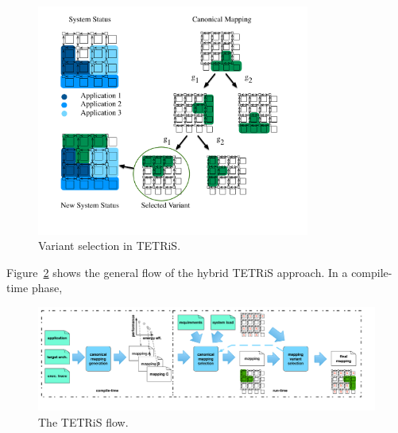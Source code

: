 \begin{figure}[th]
	\centering
	\includegraphics[width=0.8\textwidth]{figures/Variant_Selection.pdf}
	\caption{Variant selection in \ac{TETRiS}.}
	\label{fig:tetris_variant_selection}
\end{figure}

Figure~\ref{fig:tetris_flow} shows the general flow of the hybrid \ac{TETRiS} approach. 
In a compile-time phase, 

\begin{figure}[th]
	\centering
	\includegraphics[width=1.00\textwidth]{figures/tetris_flow.pdf}
	\caption{The \ac{TETRiS} flow.}
	\label{fig:tetris_flow}
\end{figure}


